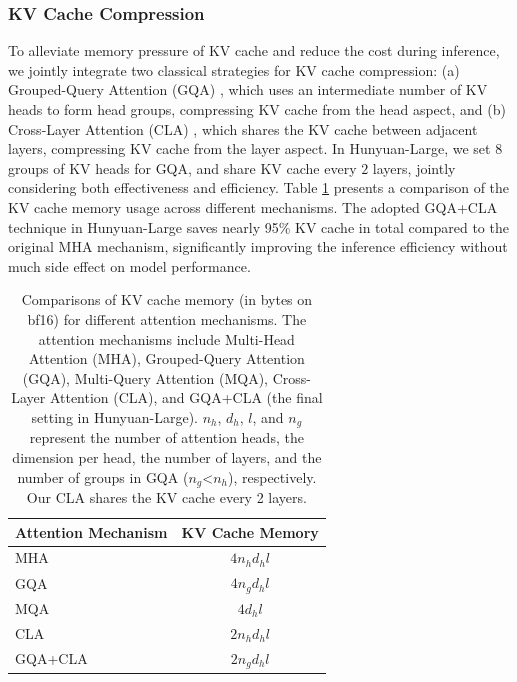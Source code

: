 \documentclass{article}
\begin{document}
\subsubsection{KV Cache Compression}
To alleviate memory pressure of KV cache and reduce the cost during inference, we jointly integrate two classical strategies for KV cache compression: (a) Grouped-Query Attention (GQA) \citep{ainslie2023gqa}, which uses an intermediate number of KV heads to form head groups, compressing KV cache from the head aspect, and (b) Cross-Layer Attention (CLA) \citep{brandon2024reducing}, which shares the KV cache between adjacent layers, compressing KV cache from the layer aspect. In Hunyuan-Large, we set $8$ groups of KV heads for GQA, and share KV cache every $2$ layers, jointly considering both effectiveness and efficiency. Table \ref{tab:kv_cache_comparison} presents a comparison of the KV cache memory usage across different mechanisms. The adopted GQA+CLA technique in Hunyuan-Large saves nearly 95\% KV cache in total compared to the original MHA mechanism, significantly improving the inference efficiency without much side effect on model performance.
\begin{table}[!hbtp]
    \centering
    \caption{Comparisons of KV cache memory (in bytes on bf16) for different attention mechanisms. The attention mechanisms include Multi-Head Attention (MHA), Grouped-Query Attention (GQA), Multi-Query Attention (MQA), Cross-Layer Attention (CLA), and GQA+CLA (the final setting in Hunyuan-Large). \(n_h\), \(d_h\), \(l\), and \(n_g\) represent the number of attention heads, the dimension per head, the number of layers, and the number of groups in GQA (\(n_g\)<\(n_h\)), respectively. Our CLA shares the KV cache every 2 layers.}
        \begin{tabular}{l|c} 
            \toprule
            \textbf{Attention Mechanism} & \textbf{KV Cache Memory} \\
            \midrule
            MHA & $4n_h d_h l$ \\
            GQA & $4n_g d_h l$ \\
            MQA & $4d_h l$ \\
            CLA & $2n_h d_h l$ \\
            GQA+CLA & $2n_g d_h l$ \\
            \bottomrule
        \end{tabular}
    \label{tab:kv_cache_comparison}
\end{table}
\end{document}

